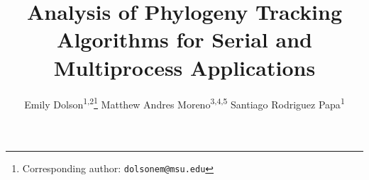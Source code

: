 \title{ Analysis of Phylogeny Tracking Algorithms for Serial and Multiprocess Applications }
\author{
    Emily Dolson\textsuperscript{1,2}\thanks{Corresponding author: \texttt{dolsonem@msu.edu}} \quad
    Matthew Andres Moreno\textsuperscript{3,4,5} \quad
    Santiago Rodriguez Papa\textsuperscript{1} \quad
}
\date{}

\newcommand{\affil}[1]{\textsuperscript{#1}}
\newcommand{\affiliations}{
\affil{1} Department of Computer Science and Engineering, Michigan State University, East Lansing, United States \\
\affil{2} Ecology, Evolution, and Behavior, Michigan State University, East Lansing, United States \\
\affil{3} Ecology and Evolutionary Biology, University of Michigan, Ann Arbor, United States \\
\affil{4} Center for the Study of Complex Systems, University of Michigan, Ann Arbor, United States \\
\affil{5} Michigan Institute for Data Science, University of Michigan, Ann Arbor, United States
}

\maketitle



